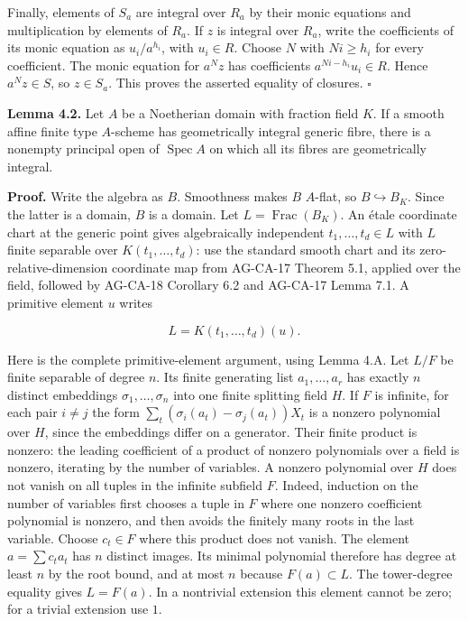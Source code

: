 \documentclass[11pt,a4paper,openany]{report}
\newcounter{none}
\begin{document}
Finally, elements of \(S_a\) are integral over \(R_a\) by their monic equations and multiplication by elements of \(R_a\). If \(z\) is integral over \(R_a\), write the coefficients of its monic equation as \(u_i/a^{h_i}\), with \(u_i\in R\). Choose \(N\) with \(Ni\ge h_i\) for every coefficient. The monic equation for \(a^Nz\) has coefficients \(a^{Ni-h_i}u_i\in R\). Hence \(a^Nz\in S\), so \(z\in S_a\). This proves the asserted equality of closures. \(\square\)

\textbf{Lemma 4.2.} Let \(A\) be a Noetherian domain with fraction field \(K\). If a smooth affine finite type \(A\)-scheme has geometrically integral generic fibre, there is a nonempty principal open of \(\operatorname{Spec}A\) on which all its fibres are geometrically integral.

\textbf{Proof.} Write the algebra as \(B\). Smoothness makes \(B\) \(A\)-flat, so \(B\hookrightarrow B_K\). Since the latter is a domain, \(B\) is a domain. Let \(L=\operatorname{Frac}(B_K)\). An étale coordinate chart at the generic point gives algebraically independent \(t_1,\ldots,t_d\in L\) with \(L\) finite separable over \(K(t_1,\ldots,t_d)\): use the standard smooth chart and its zero-relative-dimension coordinate map from AG-CA-17 Theorem 5.1, applied over the field, followed by AG-CA-18 Corollary 6.2 and AG-CA-17 Lemma 7.1. A primitive element \(u\) writes

\[
L=K(t_1,\ldots,t_d)(u).
\]

Here is the complete primitive-element argument, using Lemma 4.A. Let \(L/F\) be finite separable of degree \(n\). Its finite generating list \(a_1,\ldots,a_r\) has exactly \(n\) distinct embeddings \(\sigma_1,\ldots,\sigma_n\) into one finite splitting field \(H\). If \(F\) is infinite, for each pair \(i\ne j\) the form \(\sum_t(\sigma_i(a_t)-\sigma_j(a_t))X_t\) is a nonzero polynomial over \(H\), since the embeddings differ on a generator. Their finite product is nonzero: the leading coefficient of a product of nonzero polynomials over a field is nonzero, iterating by the number of variables. A nonzero polynomial over \(H\) does not vanish on all tuples in the infinite subfield \(F\). Indeed, induction on the number of variables first chooses a tuple in \(F\) where one nonzero coefficient polynomial is nonzero, and then avoids the finitely many roots in the last variable. Choose \(c_t\in F\) where this product does not vanish. The element \(a=\sum c_ta_t\) has \(n\) distinct images. Its minimal polynomial therefore has degree at least \(n\) by the root bound, and at most \(n\) because \(F(a)\subset L\). The tower-degree equality gives \(L=F(a)\). In a nontrivial extension this element cannot be zero; for a trivial extension use \(1\).
\end{document}

